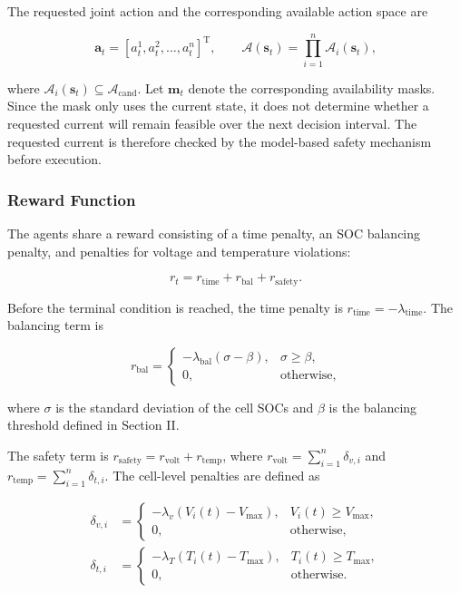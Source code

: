 \documentclass[10pt,journal,letterpaper]{IEEEtran}
\begin{document}
The requested joint action and the corresponding available action space are

\begin{equation}
\label{eq:joint_action}
\mathbf{a}_t
=
\left[
a_t^1,a_t^2,\ldots,a_t^n
\right]^{\mathrm{T}},
\qquad
\mathcal{A}(\mathbf{s}_t)
=
\prod_{i=1}^{n}\mathcal{A}_i(\mathbf{s}_t),
\end{equation}

where $\mathcal{A}_i(\mathbf{s}_t)\subseteq\mathcal{A}_{\mathrm{cand}}$. Let $\mathbf{m}_t$ denote the corresponding availability masks. Since the mask only uses the current state, it does not determine whether a requested current will remain feasible over the next decision interval. The requested current is therefore checked by the model-based safety mechanism before execution.

\subsubsection{Reward Function}

The agents share a reward consisting of a time penalty, an SOC balancing penalty, and penalties for voltage and temperature violations:

\begin{equation}
\label{eq:reward}
r_t
=
r_{\mathrm{time}}
+
r_{\mathrm{bal}}
+
r_{\mathrm{safety}}.
\end{equation}

Before the terminal condition is reached, the time penalty is $r_{\mathrm{time}}=-\lambda_{\mathrm{time}}$. The balancing term is

\begin{equation}
\label{eq:balance_reward}
r_{\mathrm{bal}}
=
\begin{cases}
-\lambda_{\mathrm{bal}}(\sigma-\beta),
& \sigma\geq\beta,\\
0,
& \text{otherwise},
\end{cases}
\end{equation}

where $\sigma$ is the standard deviation of the cell SOCs and $\beta$ is the balancing threshold defined in Section II.

The safety term is
$r_{\mathrm{safety}}=r_{\mathrm{volt}}+r_{\mathrm{temp}}$,
where
$r_{\mathrm{volt}}=\sum_{i=1}^{n}\delta_{v,i}$ and
$r_{\mathrm{temp}}=\sum_{i=1}^{n}\delta_{t,i}$.
The cell-level penalties are defined as

\begin{equation}
\label{eq:safety_reward}
\begin{aligned}
\delta_{v,i}
&=
\begin{cases}
-\lambda_v\left(V_i(t)-V_{\max}\right),
& V_i(t)\geq V_{\max},\\
0,
& \text{otherwise},
\end{cases}
\\[4pt]
\delta_{t,i}
&=
\begin{cases}
-\lambda_T\left(T_i(t)-T_{\max}\right),
& T_i(t)\geq T_{\max},\\
0,
& \text{otherwise}.
\end{cases}
\end{aligned}
\end{equation}
\end{document}
